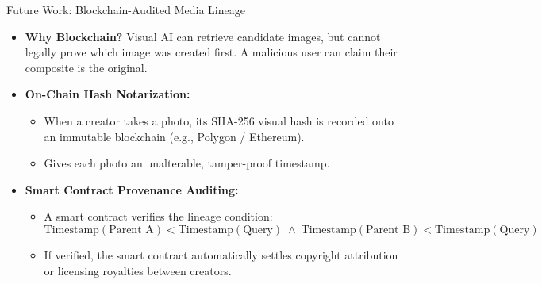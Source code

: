 \documentclass[xcolor=table]{beamer}
\begin{document}
\begin{frame}{Future Work: Blockchain-Audited Media Lineage}
  \begin{itemize}
    \item \textbf{Why Blockchain?} Visual AI can retrieve candidate images, but cannot legally prove which image was created first. A malicious user can claim their composite is the original.
    \item \textbf{On-Chain Hash Notarization:}
    \begin{itemize}
      \item When a creator takes a photo, its SHA-256 visual hash is recorded onto an immutable blockchain (e.g., Polygon / Ethereum).
      \item Gives each photo an unalterable, tamper-proof timestamp.
    \end{itemize}
    \item \textbf{Smart Contract Provenance Auditing:}
    \begin{itemize}
      \item A smart contract verifies the lineage condition:
      $$\text{Timestamp}(\text{Parent A}) < \text{Timestamp}(\text{Query}) \;\land\; \text{Timestamp}(\text{Parent B}) < \text{Timestamp}(\text{Query})$$
      \item If verified, the smart contract automatically settles copyright attribution or licensing royalties between creators.
    \end{itemize}
  \end{itemize}
\end{frame}
\end{document}
